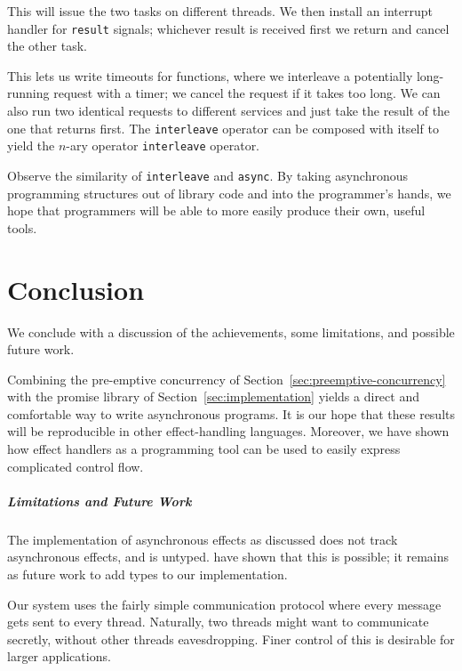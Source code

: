 \documentclass[msc,deptreport,cs]{infthesis} %
\newcommand{\code}[1]{\lstinline{#1}}
\newcommand{\todo}[1]
           {{\par\noindent\small\color{RoyalPurple}
  \framebox{\parbox{\dimexpr\linewidth-2\fboxsep-2\fboxrule}
    {\textbf{TODO:} #1}}}}
\begin{document}
This will issue the two tasks on different threads. We then install an interrupt
handler for \code{result} signals; whichever result is received first we return
and cancel the other task.

This lets us write timeouts for functions, where we interleave a potentially
long-running request with a timer; we cancel the request if it takes too long.
We can also run two identical requests to different services and just take the
result of the one that returns first. The \code{interleave} operator can be
composed with itself to yield the $n$-ary operator \code{interleave} operator.

Observe the similarity of \code{interleave} and \code{async}. By taking
asynchronous programming structures out of library code and into the
programmer's hands, we hope that programmers will be able to more easily produce
their own, useful tools.


\chapter{Conclusion}
\label{chap:conclusion}

We conclude with a discussion of the achievements, some limitations, and
possible future work.

Combining the pre-emptive concurrency of
Section~\ref{sec:preemptive-concurrency} with the promise library of
Section~\ref{sec:implementation} yields a direct and comfortable way to write
asynchronous programs. It is our hope that these results will be reproducible in
other effect-handling languages.
%
Moreover, we have shown how effect handlers as a programming tool can be used to
easily express complicated control flow.

\todo{Add more to end of paragraph}

\paragraph*{Limitations and Future Work}

The implementation of asynchronous effects as discussed does not track
asynchronous effects, and is untyped. \citeauthor{ahman2020asynchronous} have
shown that this is possible; it remains as future work to add types to our
implementation.

Our system uses the fairly simple communication protocol where every message
gets sent to every thread. Naturally, two threads might want to communicate
secretly, without other threads eavesdropping. Finer control of this is
desirable for larger applications.
\end{document}
